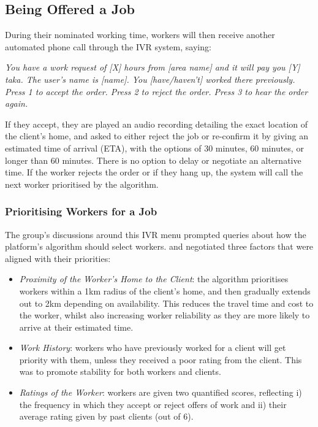 \subsection{Being Offered a Job}

During their nominated working time, workers will then receive another automated phone call through the IVR system, saying:

\begin{displayquote}
\textit{You have a work request of [X] hours from [area name] and it will pay you [Y] taka. The user's name is [name]. You [have/haven't] worked there previously. Press 1 to accept the order. Press 2 to reject the order. Press 3 to hear the order again.}
\end{displayquote}

If they accept, they are played an audio recording detailing the exact location of the client's home, and asked to either reject the job or re-confirm it by giving an estimated time of arrival (ETA), with the options of 30 minutes, 60 minutes, or longer than 60 minutes. There is no option to delay or negotiate an alternative time. If the worker rejects the order or if they hang up, the system will call the next worker prioritised by the algorithm.

\subsubsection{Prioritising Workers for a Job}
The group's discussions around this IVR menu prompted queries about how the platform's algorithm should select workers. \PC{} and \NGO{} negotiated three factors that were aligned with their priorities: 

\begin{itemize}
  \item \textit{Proximity of the Worker's Home to the Client}: the algorithm prioritises workers within a 1km radius of the client’s home, and then gradually extends out to 2km depending on availability. This reduces the travel time and cost to the worker, whilst also increasing worker reliability as they are more likely to arrive at their estimated time. 
  \item \textit{Work History}: workers who have previously worked for a client will get priority with them, unless they received a poor rating from the client. This was to promote stability for both workers and clients.
  \item \textit{Ratings of the Worker}: workers are given two quantified scores, reflecting i) the frequency in which they accept or reject offers of work and ii) their average rating given by past clients (out of 6).
\end{itemize}

